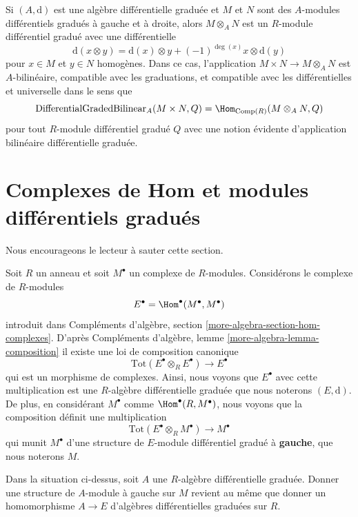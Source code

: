 \medskip\noindent
Si $(A, \text{d})$ est une algèbre différentielle graduée et
$M$ et $N$ sont des $A$-modules différentiels gradués à gauche et à droite,
alors $M \otimes_A N$ est un $R$-module différentiel gradué avec une différentielle
$$
\text{d}(x \otimes y) =
\text{d}(x) \otimes y + (-1)^{\deg(x)}x \otimes \text{d}(y)
$$
pour $x \in M$ et $y \in N$ homogènes. Dans ce cas, l'application
$M \times N \to M \otimes_A N$ est $A$-bilinéaire, compatible avec les graduations,
et compatible avec les différentielles et universelle dans le sens que
$$
\text{DifferentialGradedBilinear}_A(M \times N, Q) =
\Hom_{\text{Comp}(R)}(M \otimes_A N, Q)
$$
pour tout $R$-module différentiel gradué $Q$ avec une notion évidente
d'application bilinéaire différentielle graduée.






\section{Complexes de Hom et modules différentiels gradués}
\label{section-hom-complexes}

\noindent
Nous encourageons le lecteur à sauter cette section.

\medskip\noindent
Soit $R$ un anneau et soit $M^\bullet$ un complexe de $R$-modules.
Considérons le complexe de $R$-modules
$$
E^\bullet = \Hom^\bullet(M^\bullet, M^\bullet)
$$
introduit dans
Compléments d'algèbre, section \ref{more-algebra-section-hom-complexes}.
D'après Compléments d'algèbre, lemme \ref{more-algebra-lemma-composition} il
existe une loi de composition canonique
$$
\text{Tot}(E^\bullet \otimes_R E^\bullet) \to E^\bullet
$$
qui est un morphisme de complexes. Ainsi, nous voyons que $E^\bullet$ avec
cette multiplication est une $R$-algèbre différentielle graduée que nous
noterons $(E, \text{d})$. De plus, en considérant $M^\bullet$ comme
$\Hom^\bullet(R, M^\bullet)$, nous voyons que la composition définit une multiplication
$$
\text{Tot}(E^\bullet \otimes_R M^\bullet) \to M^\bullet
$$
qui munit $M^\bullet$ d'une structure de $E$-module différentiel gradué à {\bf
gauche}, que nous noterons $M$.

\begin{lemma}
\label{lemma-left-module-structure}
Dans la situation ci-dessus, soit $A$ une $R$-algèbre différentielle graduée.
Donner une structure de $A$-module à gauche sur $M$ revient au même que
donner un homomorphisme $A \to E$ d'algèbres différentielles graduées sur $R$.
\end{lemma}

